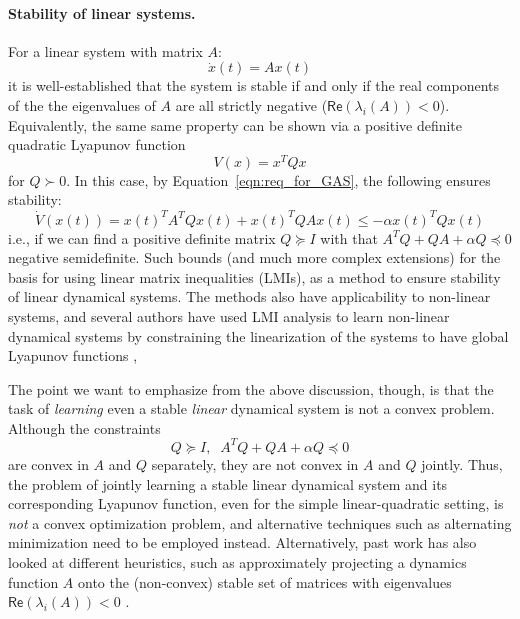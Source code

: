 \paragraph{Stability of linear systems.}
For a linear system with matrix $A$:
\begin{equation}
    \dot{x}(t) = A x(t)
\end{equation}
it is well-established that the system is stable if and only if the real components of the the eigenvalues of $A$ are all strictly negative ($\mathsf{Re}(\lambda_i(A)) < 0$).  Equivalently, the same same property can be shown via a positive definite quadratic Lyapunov function
\begin{equation}
    V(x) = x^T Q x
\end{equation}
for $Q\succ 0$.  In this case, by Equation~\ref{eqn:req_for_GAS}, the following ensures stability:
\begin{equation}
    \dot{V}(x(t)) = x(t)^T A^T Q x(t) + x(t)^T Q A x(t) \leq -\alpha x(t)^T Q x(t)
\end{equation}
i.e., if we can find a positive definite matrix $Q \succeq I$ with that $A^T Q + Q A + \alpha Q \preceq 0$ negative semidefinite.  Such bounds (and much more complex extensions) for the basis for using linear matrix inequalities (LMIs), as a method to ensure stability of linear dynamical systems.  The methods also have applicability to non-linear systems, and several authors have used LMI analysis to learn non-linear dynamical systems by constraining the linearization of the systems to have global Lyapunov functions \cite{khansari2011learning,blocher2017learning,umlauft2017learning},

The point we want to emphasize from the above discussion, though, is that the task of \emph{learning} even a stable \emph{linear} dynamical system is not a convex problem.  Although the constraints
\begin{equation}
    Q \succeq I, \;\; A^T Q + Q A + \alpha Q \preceq 0
\end{equation}
are convex in $A$ and $Q$ separately, they are not convex in $A$ and $Q$ jointly.  Thus, the problem of jointly learning a stable linear dynamical system and its corresponding Lyapunov function, even for the simple linear-quadratic setting, is \emph{not} a convex optimization problem, and alternative techniques such as alternating minimization need to be employed instead.  Alternatively, past work has also looked at different heuristics, such as approximately projecting a dynamics function $A$ onto the (non-convex) stable set of matrices with eigenvalues $\mathsf{Re}(\lambda_i(A)) < 0$ \citep{boots2008constraint}.

